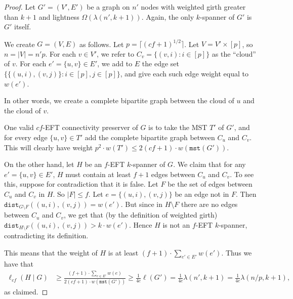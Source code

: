 \documentclass{article}
\theoremstyle{plain}
\theoremstyle{definition}
\newcommand{\dist}{\texttt{dist}}
\newcommand{\mst}{\texttt{mst}}
\begin{document}
\begin{proof}
    Let $G' = (V', E')$ be a graph on $n'$ nodes with weighted girth greater than $k+1$ and lightness $\Omega(\lambda(n', k+1))$.  Again, the only $k$-spanner of $G'$ is $G'$ itself.

    We create $G = (V, E)$ as follows.  Let $p = \lceil (cf+1)^{1/2} \rceil$.  Let $V = V' \times [p]$, so $n=|V| = n'p$.  For each $v \in V'$, we refer to $C_v = \{(v, i) : i \in [p]\}$ as the ``cloud'' of $v$.  For each $e' = \{u,v\} \in E'$, we add to $E$ the edge set $\{\{(u,i), (v,j)\} : i \in [p], j \in [p]\}$, and give each such edge weight equal to $w(e')$.


    
    In other words, we create a complete bipartite graph between the  cloud of $u$ and the cloud of $v$.
    
    One valid $cf$-EFT connectivity preserver of $G$ is to take the MST $T'$ of $G'$, and for every edge $\{u,v\} \in T'$ add the complete bipartite graph between $C_u$ and $C_v$.  This will clearly have weight $p^2 \cdot w(T') \leq 2(cf+1) \cdot w(\mst(G'))$.  
    
    On the other hand, let $H$ be an $f$-EFT $k$-spanner of $G$.  We claim that for any $e' = \{u,v\} \in E'$, $H$ must contain at least $f+1$ edges between $C_u$ and $C_v$.  To see this, suppose for contradiction that it is false.  Let $F$ be the set of edges between $C_u$ and $C_v$ in $H$.  So $|F| \leq f$.  Let $e = \{(u,i), (v,j)\}$ be an edge not in $F$.  Then $\dist_{G \setminus F}((u,i), (v,j)) = w(e')$.  But since in $H \setminus F$ there are no edges between $C_u$ and $C_v$, we get that (by the definition of weighted girth) $\dist_{H \setminus F}((u,i), (v,j))> k \cdot w(e')$.  Hence $H$ is not an $f$-EFT $k$-spanner, contradicting its definition.  

    This means that the weight of $H$ is at least $(f+1) \cdot \sum_{e' \in E'} w(e')$.  Thus we have that
    \begin{align*}
        \ell_{cf}(H \mid G) &\geq \frac{(f+1) \cdot \sum_{e \in E'} w(e)}{2(cf+1) \cdot w(\mst(G'))} \geq \frac{1}{4c} \ell(G') = \frac{1}{4c} \lambda(n', k+1) = \frac{1}{4c} \lambda(n/p, k+1),
    \end{align*}
    as claimed.
\end{proof}



\fi
\end{document}
